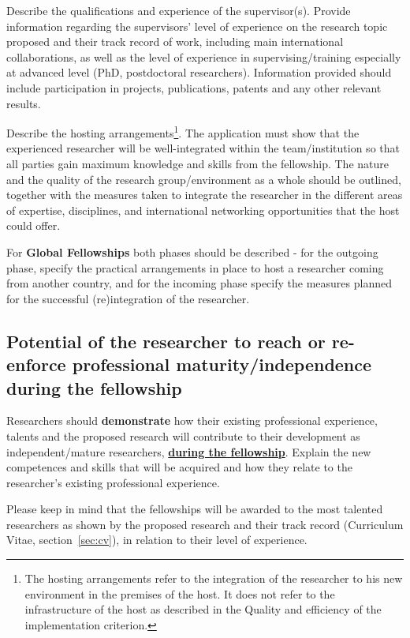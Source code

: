 Describe the qualifications and experience of the supervisor(s). Provide information
regarding the supervisors' level of experience on the research topic proposed and their
track record of work, including main international collaborations, as well as the level
of experience in supervising/training especially at advanced level (PhD, postdoctoral
researchers). Information provided should include participation in projects,
publications, patents and any other relevant results.

\medskip\noindent
Describe the hosting arrangements\footnote{The hosting arrangements refer to the integration
of the researcher to his new environment in the premises of the host. 
It does not refer to the infrastructure of the host as described in
the Quality and efficiency of the implementation criterion.}.
The application must show that the experienced
researcher will be well-integrated within the team/institution so that all parties gain
maximum knowledge and skills from the fellowship. The nature and the quality of the
research group/environment as a whole should be outlined, together with the measures
taken to integrate the researcher in the different areas of expertise, disciplines, and
international networking opportunities that the host could offer.

\medskip\noindent
For \textbf{Global Fellowships} both phases should be described - for the outgoing phase,
specify the practical arrangements in place to host a researcher coming from another
country, and for the incoming phase specify the measures planned for the successful
(re)integration of the researcher.


\subsection{Potential of the researcher to reach or re-enforce professional maturity/independence during the fellowship}
\label{sec:excellence_maturity}

Researchers should \textbf{demonstrate} how their existing professional experience, talents
and the proposed research will contribute to their development as independent/mature
researchers, \ul{\textbf{during the fellowship}}. Explain the new competences and skills that will
be acquired and how they relate to the researcher’s existing professional experience.

\medskip\noindent
Please keep in mind that the fellowships will be awarded to the most talented
researchers as shown by the proposed research and their track record (Curriculum
Vitae, section~\ref{sec:cv}), in relation to their level of experience.




